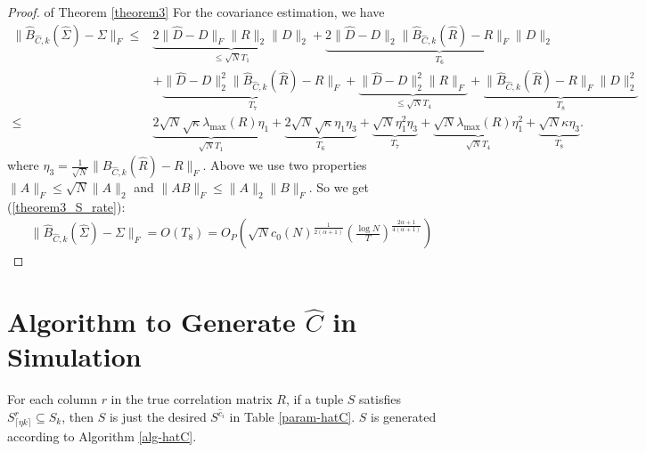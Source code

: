 \begin{proof}{ of Theorem \ref{theorem3}}
    For the covariance estimation, we have 
    \begin{equation}
    	\begin{split}
    		\lVert \hat B_{\hat C,k}(\hat \Sigma) - \Sigma \rVert_F \leq & 
    		    \underbrace{ 2 \lVert \hat D -	D \rVert_F \lVert R \rVert_2 \lVert D \rVert_2 }_{\leq \sqrt N T_1} + 
    		    \underbrace{ 2\lVert \hat D - D \rVert_2 \lVert \hat B_{\hat C,k}(\hat R) - R \rVert_F \lVert D \rVert_2 }_{T_6} \\
    	    & + \underbrace{ \lVert \hat D - D \rVert_2^2 \lVert \hat B_{\hat C,k}(\hat R) - R \rVert_F }_{T_7} + 
    	        \underbrace{ \lVert \hat D - D \rVert_2^2 \lVert R \rVert_F }_{\leq \sqrt N T_4} + 
    	        \underbrace{ \lVert \hat B_{\hat C,k}(\hat R) - R \rVert_F \lVert D \rVert_2^2 }_{T_8} \\
            \leq & \underbrace{ 2 \sqrt N \sqrt \kappa \lambda_{\max}(R) \eta_1 }_{ \sqrt N T_1} + 
                \underbrace{ 2 \sqrt N \sqrt{\kappa} \eta_1 \eta_3}_{T_6} + 
                \underbrace{ \sqrt N \eta_1^2 \eta_3 }_{T_7} + 
                \underbrace{ \sqrt N \lambda_{\max}(R) \eta_1^2 }_{\sqrt N T_4} + 
                \underbrace{\sqrt N \kappa \eta_3}_{T_8} .
        \end{split}
        \label{cor2cov F}
    \end{equation}
    where $\eta_3 = \frac{1}{\sqrt N} \| B_{\hat C, k}(\hat R) - R \|_F $. Above we use two properties $\|A\|_F \leq \sqrt N \|A\|_2$ and $\|AB\|_F \leq \|A\|_2 \|B\|_F$. So we get (\ref{theorem3_S_rate}):
    \begin{equation}
    	\begin{split}
    		\| \hat B_{\hat C, k}(\hat \Sigma) - \Sigma \|_F = O(T_8) 
            = O_P(  \sqrt N  c_0(N)^\frac{1}{2(\alpha + 1)} (\frac{\log N}{T})^\frac{2\alpha +1}{4(\alpha + 1)}  ) 
    	\end{split}
    \end{equation}
\end{proof}

\section{Algorithm to Generate $\hat C$ in Simulation}\label{algo}
For each column $r$ in the true correlation matrix $R$, if a tuple $S$ satisfies $S^{r}_{\lceil \eta k \rceil} \subseteq S_k$, then $S$ is just the desired $S^{\hat{c}_i}$ in Table \ref{param-hatC}. $S$ is generated according to Algorithm \ref{alg-hatC}.

